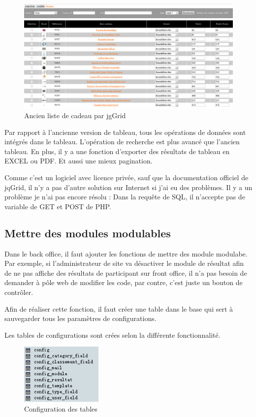 \begin{figure}[hbtp]
\includegraphics[width=16cm]{body/images/cadeau-old.png}
\caption{Ancien liste de cadeau par jgGrid}
\end{figure}

Par rapport à l'ancienne version de tableau, tous les opérations de données sont intégrés dans le tableau. L'opération de recherche est plus avancé que l'ancien tableau. En plus, il y a une fonction d'exporter des résultats de tableau en EXCEL ou PDF. Et aussi une mieux pagination.

Comme c'est un logiciel avec licence privée, sauf que la documentation officiel de jqGrid, il n'y a pas d'autre solution sur Internet si j'ai eu des problèmes. Il y a un problème je n'ai pas encore résolu : 
Dans la requête de SQL, il n'accepte pas de variable de GET et POST de PHP. 

\subsection{Mettre des modules modulables}
Dans le back office, il faut ajouter les fonctions de mettre des module modulabe. Par exemple, si l'administrateur de site va désactiver le module de résultat afin de ne pas affiche des résultats de participant sur front office, il n'a pas besoin de demander à pôle web de modifier les code, par contre, c'est juste un bouton de contrôler. 

Afin de réaliser cette fonction, il faut créer une table dans le base qui sert à sauvegarder tous les paramètres de configurations.  

Les tables de configurations sont crées selon la différente fonctionnalité. 
\begin{figure}[hbtp]
\centering
\includegraphics[width=4cm]{body/images/config.png}
\caption{Configuration des tables}
\end{figure}



